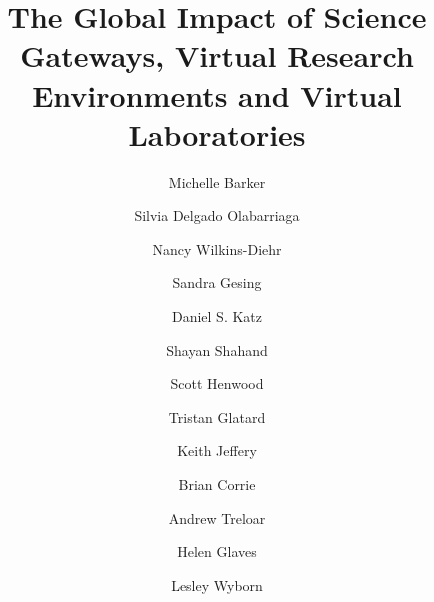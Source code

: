 \documentclass[review]{elsarticle}
\begin{document}
\begin{frontmatter}

\title{The Global Impact of Science Gateways, Virtual Research Environments and Virtual Laboratories}


\author[michele]{Michelle Barker}
\address[michele]{ 
	National eResearch Collaboration Tools and Resources and James Cook University, Australia}

\author[silvia]{Silvia Delgado Olabarriaga}
\address[silvia]{
	Amsterdam Medical Centers -- Location AMC, University of Amsterdam, The Netherlands
}

\author[nancy]{Nancy Wilkins-Diehr}
\address[nancy]{
	San Diego Supercomputer Center, University of California San Diego, USA
}

\author[sandra]{Sandra Gesing}
\address[sandra]{
Department of Computer Science and Engineering/Center for Research Computing, University of Notre Dame, USA}

\author[dan]{Daniel S. Katz}
\address[dan]{National Center for Supercomputing Applications, Department of Computer Science, Department of Electrical and Computer Engineering, School of Information Sciences, University of Illinois at Urbana-Champaign, USA}

\author[shayan]{Shayan Shahand} 
\address[shayan]{ServiceNow and Academic Medical Center -- University of Amsterdam, The Netherlands}

\author[scott]{Scott Henwood}
\address[scott]{CANARIE, Canada}

\author[tristan]{Tristan Glatard} 
\address[tristan]{Department of Computer Science and Software Engineering, Concordia University, Canada}


\author[keith]{Keith Jeffery}
\address[keith]{VRE4EIC and ERCIM, UK}

\author[brian]{Brian Corrie} 
\address[brian]{Simon Fraser University, Canada and New Zealand eScience Infrastructure, New Zealand}

\author[andrew]{Andrew Treloar}
\address[andrew]{Australian National Data Service, Australia}

\author[helen]{Helen Glaves} 
\address[helen]{British Geological Survey, UK}

\author[lesley]{Lesley Wyborn}
\address[lesley]{National Computational Infrastructure Facility and The Research School of Earth Sciences, Australian National University, Australia}


\end{frontmatter}
\end{document}

